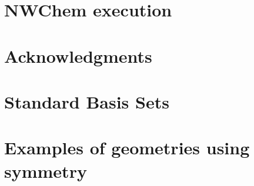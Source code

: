 \section{NWChem execution}  


\section{Acknowledgments}


\appendix

\section{Standard Basis Sets}


\section{Examples of geometries using symmetry}



